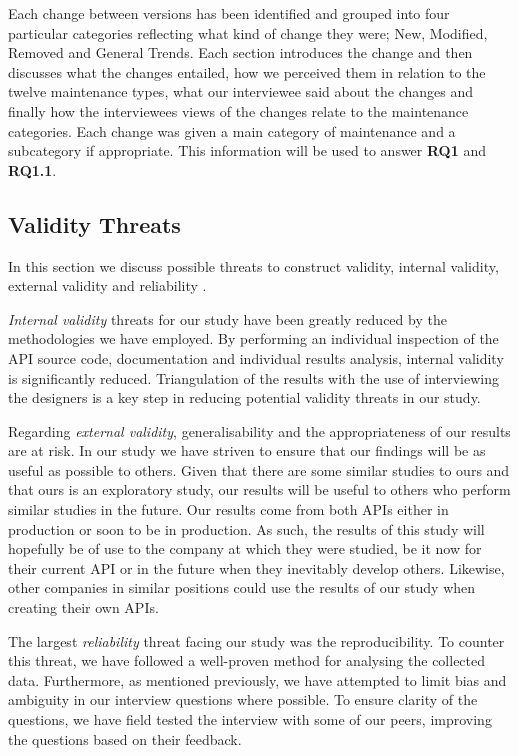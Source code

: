 \documentclass{sig-alternate}
\begin{document}
Each change between versions has been identified and grouped into four particular categories reflecting what kind of change they were; New, Modified, Removed and General Trends. Each section introduces the change and then discusses what the changes entailed, how we perceived them in relation to the twelve maintenance types, what our interviewee said about the changes and finally how the interviewees views of the changes relate to the maintenance categories. Each change was given a main category of maintenance and a subcategory if appropriate. This information will be used to answer \textbf{RQ1} and \textbf{RQ1.1}.


\subsection{Validity Threats} \label{validity_threats}
In this section we discuss possible threats to construct validity, internal validity, external validity and reliability \cite{runeson2009guidelines}.


\textit{Internal validity} threats for our study have been greatly reduced by the methodologies we have employed. By performing an individual inspection of  the API source code, documentation and individual results analysis, internal validity is significantly reduced. Triangulation of the results with the use of interviewing the designers is a key step in reducing potential validity threats in our study.

Regarding \textit{external validity}, generalisability and the appropriateness of our results are at risk. In our study we have striven to ensure that our findings will be as useful as possible to others. Given that there are some similar studies to ours and that ours is an exploratory study, our results will be useful to others who perform similar studies in the future. Our results come from both APIs either in production or soon to be in production. As such, the results of this study will hopefully be of use to the company at which they were studied, be it now for their current API or in the future when they inevitably develop others. Likewise, other companies in similar positions could use the results of our study when creating their own APIs.

The largest \textit{reliability} threat facing our study was the reproducibility. To counter this threat, we have followed a well-proven method for analysing the collected data. Furthermore, as mentioned previously, we have attempted to limit bias and ambiguity in our interview questions where possible. To ensure clarity of the questions, we have field tested the interview with some of our peers, improving the questions based on their feedback.
\end{document}
